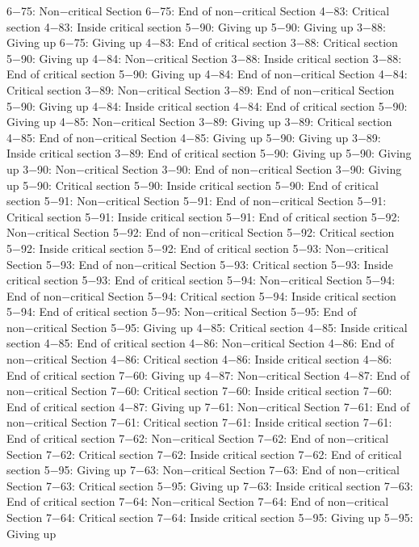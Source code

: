 6−75: Non−critical Section
6−75: End of non−critical Section
4−83: Critical section
4−83: Inside critical section
5−90: Giving up
5−90: Giving up
3−88: Giving up
6−75: Giving up
4−83: End of critical section
3−88: Critical section
5−90: Giving up
4−84: Non−critical Section
3−88: Inside critical section
3−88: End of critical section
5−90: Giving up
4−84: End of non−critical Section
4−84: Critical section
3−89: Non−critical Section
3−89: End of non−critical Section
5−90: Giving up
4−84: Inside critical section
4−84: End of critical section
5−90: Giving up
4−85: Non−critical Section
3−89: Giving up
3−89: Critical section
4−85: End of non−critical Section
4−85: Giving up
5−90: Giving up
3−89: Inside critical section
3−89: End of critical section
5−90: Giving up
5−90: Giving up
3−90: Non−critical Section
3−90: End of non−critical Section
3−90: Giving up
5−90: Critical section
5−90: Inside critical section
5−90: End of critical section
5−91: Non−critical Section
5−91: End of non−critical Section
5−91: Critical section
5−91: Inside critical section
5−91: End of critical section
5−92: Non−critical Section
5−92: End of non−critical Section
5−92: Critical section
5−92: Inside critical section
5−92: End of critical section
5−93: Non−critical Section
5−93: End of non−critical Section
5−93: Critical section
5−93: Inside critical section
5−93: End of critical section
5−94: Non−critical Section
5−94: End of non−critical Section
5−94: Critical section
5−94: Inside critical section
5−94: End of critical section
5−95: Non−critical Section
5−95: End of non−critical Section
5−95: Giving up
4−85: Critical section
4−85: Inside critical section
4−85: End of critical section
4−86: Non−critical Section
4−86: End of non−critical Section
4−86: Critical section
4−86: Inside critical section
4−86: End of critical section
7−60: Giving up
4−87: Non−critical Section
4−87: End of non−critical Section
7−60: Critical section
7−60: Inside critical section
7−60: End of critical section
4−87: Giving up
7−61: Non−critical Section
7−61: End of non−critical Section
7−61: Critical section
7−61: Inside critical section
7−61: End of critical section
7−62: Non−critical Section
7−62: End of non−critical Section
7−62: Critical section
7−62: Inside critical section
7−62: End of critical section
5−95: Giving up
7−63: Non−critical Section
7−63: End of non−critical Section
7−63: Critical section
5−95: Giving up
7−63: Inside critical section
7−63: End of critical section
7−64: Non−critical Section
7−64: End of non−critical Section
7−64: Critical section
7−64: Inside critical section
5−95: Giving up
5−95: Giving up
